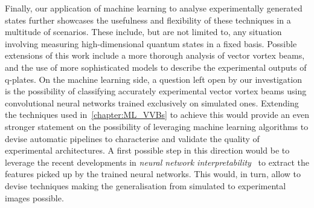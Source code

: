 \documentclass[12pt,twoside]{report}
\begin{document}
Finally, our application of machine learning to analyse experimentally generated states further showcases the usefulness and flexibility of these techniques in a multitude of scenarios.
These include, but are not limited to, any situation involving measuring high-dimensional quantum states in a fixed basis.
Possible extensions of this work include a more thorough analysis of vector vortex beams, and the use of more sophisticated models to describe the experimental outputs of q-plates.
On the machine learning side, a question left open by our investigation is the possibility of classifying accurately experimental vector vortex beams using convolutional neural networks trained exclusively on simulated ones.
Extending the techniques used in~\cref{chapter:ML_VVBs} to achieve this would provide an even stronger statement on the possibility of leveraging machine learning algorithms to devise automatic pipelines to characterise and validate the quality of experimental architectures.
A first possible step in this direction would be to leverage the recent developments in \emph{neural network interpretability}~\cite{olah2018the} to extract the features picked up by the trained neural networks. This would, in turn, allow to devise techniques making the generalisation from simulated to experimental images possible.



\end{document}
